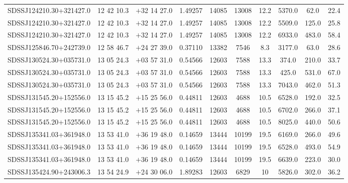 \begin{landscape}
\begin{center}
\begin{longtable}{l c c c c c c c c c}
SDSSJ124210.30+321427.0  & 12 42 10.3  &         $+$32 14 27.0  &       1.49257  & 14085  &   13008  &      12.2  &      5370.0  &  62.0  &   22.4  \\
SDSSJ124210.30+321427.0  & 12 42 10.3  &         $+$32 14 27.0  &       1.49257  & 14085  &   13008  &      12.2  &      5509.0  &  125.0  &  25.8  \\
SDSSJ124210.30+321427.0  & 12 42 10.3  &         $+$32 14 27.0  &       1.49257  & 14085  &   13008  &      12.2  &      6933.0  &  483.0  &  58.4  \\
SDSSJ125846.70+242739.0  & 12 58 46.7  &         $+$24 27 39.0  &       0.37110  & 13382  &   7546  &       8.3  &       3177.0  &  63.0  &   28.6  \\
SDSSJ130524.30+035731.0  & 13 05 24.3  &         $+$03 57 31.0  &       0.54566  & 12603  &   7588  &       13.3  &      374.0  &   210.0  &  33.7  \\
SDSSJ130524.30+035731.0  & 13 05 24.3  &         $+$03 57 31.0  &       0.54566  & 12603  &   7588  &       13.3  &      425.0  &   531.0  &  67.0  \\
SDSSJ130524.30+035731.0  & 13 05 24.3  &         $+$03 57 31.0  &       0.54566  & 12603  &   7588  &       13.3  &      7043.0  &  462.0  &  51.3  \\
SDSSJ131545.20+152556.0  & 13 15 45.2  &         $+$15 25 56.0  &       0.44811  & 12603  &   4688  &       10.5  &      6528.0  &  192.0  &  32.5  \\
SDSSJ131545.20+152556.0  & 13 15 45.2  &         $+$15 25 56.0  &       0.44811  & 12603  &   4688  &       10.5  &      6702.0  &  266.0  &  37.1  \\
SDSSJ131545.20+152556.0  & 13 15 45.2  &         $+$15 25 56.0  &       0.44811  & 12603  &   4688  &       10.5  &      8025.0  &  440.0  &  50.6  \\
SDSSJ135341.03+361948.0  & 13 53 41.0  &         $+$36 19 48.0  &       0.14659  & 13444  &   10199  &      19.5  &      6169.0  &  266.0  &  49.6  \\
SDSSJ135341.03+361948.0  & 13 53 41.0  &         $+$36 19 48.0  &       0.14659  & 13444  &   10199  &      19.5  &      6528.0  &  493.0  &  54.9  \\
SDSSJ135341.03+361948.0  & 13 53 41.0  &         $+$36 19 48.0  &       0.14659  & 13444  &   10199  &      19.5  &      6639.0  &  223.0  &  30.0  \\
SDSSJ135424.90+243006.3  & 13 54 24.9  &         $+$24 30 06.0  &       1.89283  & 12603  &   6829  &       10  &        5826.0  &  302.0  &  36.2  \\

\end{longtable}
\end{center}
\end{landscape}
